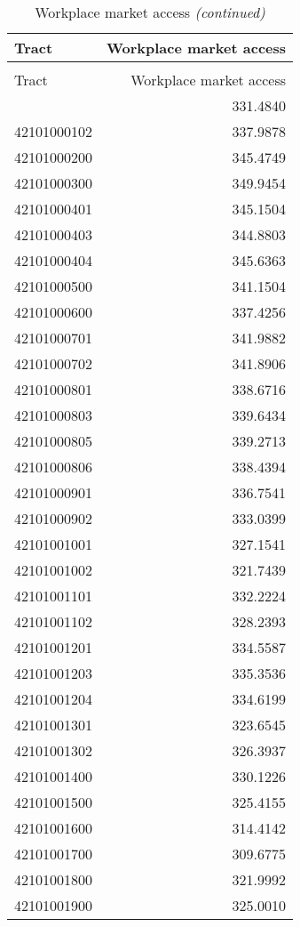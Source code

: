 
\begin{longtable}[t]{lr}
\caption{Workplace market access}\\
\toprule
Tract & Workplace market access\\
\midrule
\endfirsthead
\caption[]{Workplace market access \textit{(continued)}}\\
\toprule
Tract & Workplace market access\\
\midrule
\endhead

\endfoot
\bottomrule
\endlastfoot
42101000101 & 331.4840\\
42101000102 & 337.9878\\
42101000200 & 345.4749\\
42101000300 & 349.9454\\
42101000401 & 345.1504\\
42101000403 & 344.8803\\
42101000404 & 345.6363\\
42101000500 & 341.1504\\
42101000600 & 337.4256\\
42101000701 & 341.9882\\
42101000702 & 341.8906\\
42101000801 & 338.6716\\
42101000803 & 339.6434\\
42101000805 & 339.2713\\
42101000806 & 338.4394\\
42101000901 & 336.7541\\
42101000902 & 333.0399\\
42101001001 & 327.1541\\
42101001002 & 321.7439\\
42101001101 & 332.2224\\
42101001102 & 328.2393\\
42101001201 & 334.5587\\
42101001203 & 335.3536\\
42101001204 & 334.6199\\
42101001301 & 323.6545\\
42101001302 & 326.3937\\
42101001400 & 330.1226\\
42101001500 & 325.4155\\
42101001600 & 314.4142\\
42101001700 & 309.6775\\
42101001800 & 321.9992\\
42101001900 & 325.0010\\

\end{longtable}
